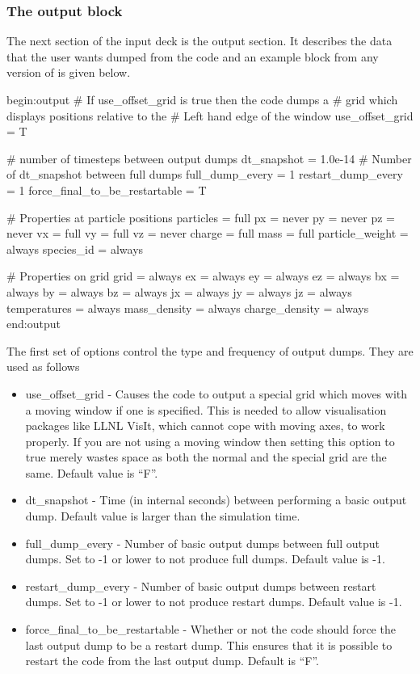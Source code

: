 \subsubsection{The output block}
The next section of the input deck is the output section. It describes the
data that the user wants dumped from the code and an example block from any
version of {\EPOCH} is given below.
\begin{boxverbatim}
begin:output
   # If use_offset_grid is true then the code dumps a
   # grid which displays positions relative to the
   # Left hand edge of the window
   use_offset_grid = T

   # number of timesteps between output dumps
   dt_snapshot = 1.0e-14
   # Number of dt_snapshot between full dumps
   full_dump_every = 1
   restart_dump_every = 1
   force_final_to_be_restartable = T

   # Properties at particle positions
   particles = full
   px = never
   py = never
   pz = never
   vx = full
   vy = full
   vz = never
   charge = full
   mass = full
   particle_weight = always
   species_id = always

   # Properties on grid
   grid = always
   ex = always
   ey = always
   ez = always
   bx = always
   by = always
   bz = always
   jx = always
   jy = always
   jz = always
   temperatures = always
   mass_density = always
   charge_density = always
end:output
\end{boxverbatim}

The first set of options control the type and frequency of output dumps. They
are used as follows\\
\begin{itemize}
\item use\_offset\_grid - Causes the code to output a special grid which moves
  with a moving window if one is specified. This is needed to allow
  visualisation packages like LLNL VisIt, which cannot cope with moving axes, to
  work properly. If you are not using a moving window then setting this option
  to true merely wastes space as both the normal and the special grid are the
  same. Default value is ``F''.
\item dt\_snapshot - Time (in internal seconds) between performing a basic
  output dump. Default value is larger than the simulation time.
\item full\_dump\_every - Number of basic output dumps between full output
  dumps. Set to -1 or lower to not produce full dumps. Default value is -1.
\item restart\_dump\_every - Number of basic output dumps between restart
  dumps. Set to -1 or lower to not produce restart dumps. Default value is -1.
\item force\_final\_to\_be\_restartable - Whether or not the code should force
  the last output dump to be a restart dump. This ensures that it is possible
  to restart the code from the last output dump. Default is ``F''.
\end{itemize}

